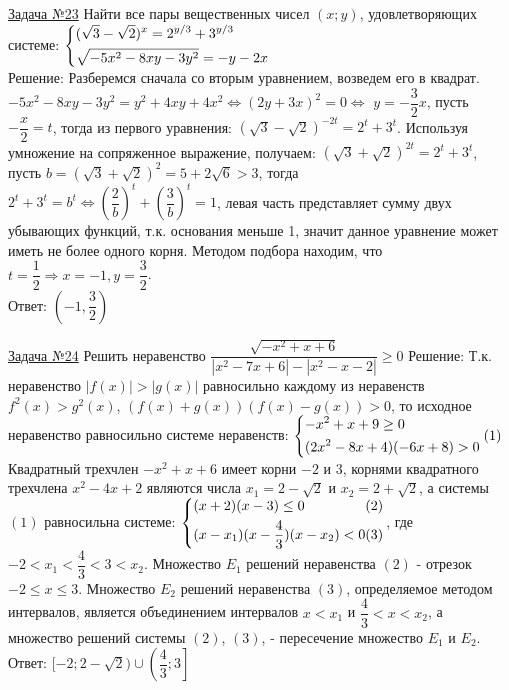 \documentclass[a4paper,12pt]{article} %
\begin{document}
\label{Problem23}
\underline{Задача №23}
Найти все пары вещественных чисел $(x;y)$, удовлетворяющих системе:
$\begin{dcases}
	(\sqrt3-\sqrt2)^x=2^{y/3}+3^{y/3} \\
	\sqrt{-5x^2-8xy-3y^2}=-y-2x
\end{dcases}$\\
Решение: Разберемся сначала со вторым уравнением, возведем его в квадрат.
$-5x^2-8xy-3y^2=y^2+4xy+4x^2 \Leftrightarrow (2y+3x)^2=0 \Leftrightarrow $
$y=-\dfrac32 x$, пусть $-\dfrac{x}{2}=t$, тогда из первого уравнения:
$(\sqrt3-\sqrt2)^{-2t}=2^t+3^t$. Используя умножение на сопряженное выражение,
получаем: $(\sqrt3+\sqrt2)^{2t}=2^t+3^t$, пусть $b=(\sqrt3+\sqrt2)^2=5+2\sqrt6 > 3$, 
тогда $2^t+3^t=b^t \Leftrightarrow \left( \dfrac{2}{b} \right)^t + \left( \dfrac{3}{b} \right)^t=1$,
левая часть представляет сумму двух убывающих функций, т.к. основания меньше 1,
значит данное уравнение может иметь не более одного корня. Методом подбора
находим, что $t=\dfrac12 \Rightarrow x=-1, y=\dfrac32$.\\
Ответ: $\left(-1, \dfrac32\right)$

\label{Problem24}
\underline{Задача №24}
Решить неравенство $\dfrac{\sqrt{-x^2+x+6}}{|x^2-7x+6|-|x^2-x-2|} \ge 0$\newline
Решение: Т.к. неравенство $|f(x)|>|g(x)|$ равносильно каждому из неравенств
$f^2(x)>g^2(x)$, $(f(x)+g(x))(f(x)-g(x))>0$, то исходное неравенство равносильно
системе неравенств: 
$\begin{dcases}
	-x^2+x+9 \ge 0 \\
	(2x^2-8x+4)(-6x+8) > 0
\end{dcases}(1)$\\
Квадратный трехчлен $-x^2+x+6$ имеет корни $-2$ и $3$, корнями квадратного
трехчлена $x^2-4x+2$ являются числа $x_1=2-\sqrt2$ и $x_2=2+\sqrt2$, а системы $(1)$ равносильна
системе:
$\begin{dcases}
	(x+2)(x-3) \le 0 \hfill (2) \\
	(x-x_1)(x-\dfrac43)(x-x_2) < 0 \hfill (3)
\end{dcases}$, где $-2<x_1<\dfrac43<3<x_2$. Множество $E_1$ решений неравенства $(2)$ - отрезок
$-2 \le x \le 3$. Множество $E_2$ решений неравенства $(3)$, определяемое методом интервалов, является
объединением интервалов $x<x_1$ и $\dfrac43<x<x_2$, а множество решений системы $(2)$, $(3)$, - пересечение
множество $E_1$ и $E_2$.\\
Ответ: $[-2;2-\sqrt2) \cup \left(\dfrac43; 3\right]$
\end{document}
